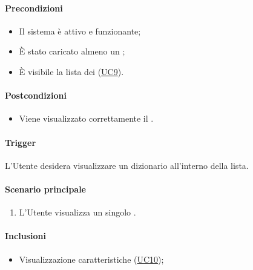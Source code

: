 \paragraph*{Precondizioni}
\begin{itemize}
  \item Il sistema è attivo e funzionante;
  \item È stato caricato almeno un ;
  \item È visibile la lista dei  (\hyperref[UC9]{UC9}).
\end{itemize}

\paragraph*{Postcondizioni}
\begin{itemize}
  \item Viene visualizzato correttamente il .
\end{itemize}

\paragraph*{Trigger}
L'Utente desidera visualizzare un dizionario all'interno della lista.

\paragraph*{Scenario principale}
\begin{enumerate}
  \item L'Utente visualizza un singolo .
\end{enumerate}

\paragraph*{Inclusioni}
\begin{itemize}
  \item Visualizzazione caratteristiche  (\hyperref[UC10]{UC10});
\end{itemize}